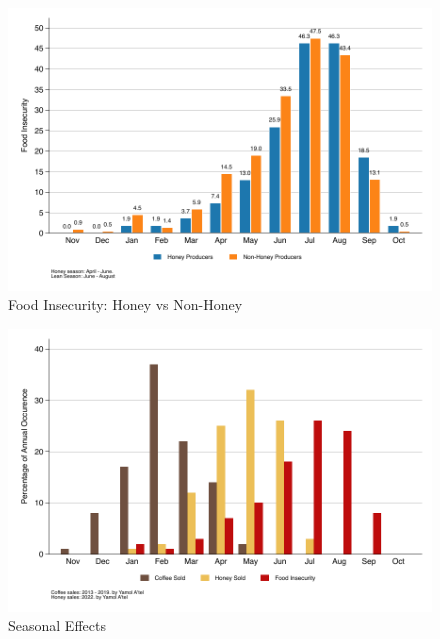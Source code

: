 \documentclass[../main.tex]{subfiles}
\begin{document}
\begin{figure}[h!]
    \centering
    \caption{Food Insecurity: Honey vs Non-Honey}
    \label{fig:graph_food_insecurity_honey_nonhoney}    
    \includegraphics[width=1\textwidth]{project/figures/pdf/graph_food_insecurity_honey_nonhoney.pdf}
\end{figure}

\begin{figure}[h!]
    \centering
    \caption{Seasonal Effects}
    \label{fig:graph_seasonal_effects}   
    \includegraphics[width=1\textwidth]{project/figures/pdf/graph_seasonal_effects.pdf}
\end{figure}






%








\end{document}

